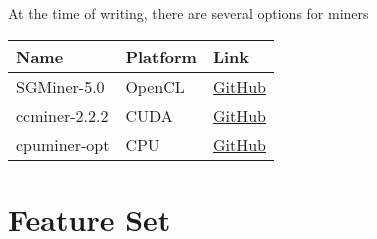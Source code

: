 \documentclass[11pt,a4paperpaper,]{report}
\begin{document}
At the time of writing, there are several options for miners

\begin{longtable}[]{@{}lll@{}}
\toprule
\begin{minipage}[b]{0.19\columnwidth}\raggedright\strut
Name\strut
\end{minipage} & \begin{minipage}[b]{0.22\columnwidth}\raggedright\strut
Platform\strut
\end{minipage} & \begin{minipage}[b]{0.44\columnwidth}\raggedright\strut
Link\strut
\end{minipage}\tabularnewline
\midrule
\endhead
\begin{minipage}[t]{0.19\columnwidth}\raggedright\strut
SGMiner-5.0\strut
\end{minipage} & \begin{minipage}[t]{0.22\columnwidth}\raggedright\strut
OpenCL\strut
\end{minipage} & \begin{minipage}[t]{0.44\columnwidth}\raggedright\strut
\href{https://github.com/genesismining/sgminer-gm}{GitHub}\strut
\end{minipage}\tabularnewline
\begin{minipage}[t]{0.19\columnwidth}\raggedright\strut
ccminer-2.2.2\strut
\end{minipage} & \begin{minipage}[t]{0.22\columnwidth}\raggedright\strut
CUDA\strut
\end{minipage} & \begin{minipage}[t]{0.44\columnwidth}\raggedright\strut
\href{https://github.com/tpruvot/ccminer}{GitHub}\strut
\end{minipage}\tabularnewline
\begin{minipage}[t]{0.19\columnwidth}\raggedright\strut
cpuminer-opt\strut
\end{minipage} & \begin{minipage}[t]{0.22\columnwidth}\raggedright\strut
CPU\strut
\end{minipage} & \begin{minipage}[t]{0.44\columnwidth}\raggedright\strut
\href{https://github.com/tpruvot/cpuminer-multi}{GitHub}\strut
\end{minipage}\tabularnewline
\bottomrule
\end{longtable}

\chapter{Feature Set}\label{feature-set}
\end{document}
